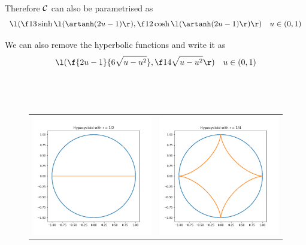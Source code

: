 \documentclass[a4paper]{article}
\begin{document}
Therefore $\cal C$ can also be parametrised as $$\l( \f13 \sinh\l(\artanh(2u - 1)\r), \f12 \cosh\l(\artanh(2u - 1)\r) \r) \quad u \in (0, 1)$$

We can also remove the hyperbolic functions and write it as $$\l( \f{2u-1}{6\sqrt{u - u^2}}, \f1{4\sqrt{u - u^2}} \r) \quad u \in (0, 1)$$


\subsection{~}

\begin{figure}[h]
	\centering
	\begin{tabular}{cc}
		\includegraphics[scale=0.4]{Q3a-1} & \includegraphics[scale=0.4]{Q3a-2}\\

\end{tabular}
\end{figure}
\end{document}
